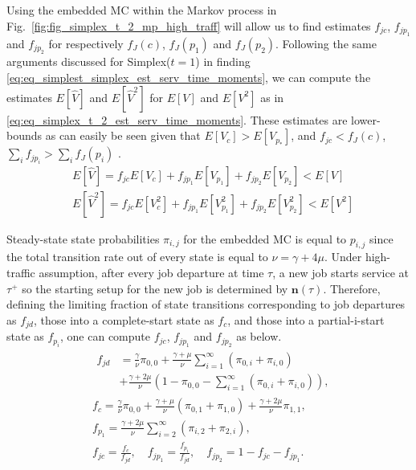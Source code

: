 \documentclass[sigconf,draft]{acmart}
\begin{document}
Using the embedded MC within the Markov process in Fig.~\ref{fig:fig_simplex_t_2_mp_high_traff} will allow us to find estimates $f_{jc}$, $f_{jp_1}$ and $f_{jp_2}$ for respectively $f_J(c)$, $f_J(p_1)$ and $f_J(p_2)$. Following the same arguments discussed for Simplex($t=1$) in finding \eqref{eq:eq_simplest_simplex_est_serv_time_moments}, we can compute the estimates $E[\hat{V}]$ and $E[\hat{V}^2]$ for $E[V]$ and $E[V^2]$ as in \eqref{eq:eq_simplex_t_2_est_serv_time_moments}. These estimates are lower-bounds as can easily be seen given that $E[V_c] > E[V_{p_*}]$, and $f_{jc} < f_J(c)$, $\sum_{i}f_{jp_i} > \sum_{i}f_J(p_i)$ .
\begin{equation}
  \label{eq:eq_simplex_t_2_est_serv_time_moments}
  \begin{split}
    & E[\hat{V}] = f_{jc}E[V_c] + f_{jp_1}E[V_{p_1}] + f_{jp_2}E[V_{p_2}] < E[V] \\
    & E[\hat{V}^2] = f_{jc}E[V_c^2] + f_{jp_1}E[V_{p_1}^2] + f_{jp_2}E[V_{p_2}^2] < E[V^2]
  \end{split}
\end{equation}

Steady-state state probabilities $\pi_{i,j}$ for the embedded MC is equal to $p_{i,j}$ since the total transition rate out of every state is equal to $\nu=\gamma+4\mu$. Under high-traffic assumption, after every job departure at time $\tau$, a new job starts service at $\tau^+$ so the starting setup for the new job is determined by $\bm{n}(\tau)$. Therefore, defining the limiting fraction of state transitions corresponding to job departures as $f_{jd}$, those into a complete-start state as $f_c$, and those into a partial-i-start state as $f_{p_i}$, one can compute $f_{jc}$, $f_{jp_1}$ and $f_{jp_2}$ as below.
\begin{equation}
  \label{eq:eq_simplex_t_2_start_setup_fracs}
  \begin{split}
    & \begin{aligned}
      f_{jd} &= \frac{\gamma}{\nu}\pi_{0,0} + \frac{\gamma+\mu}{\nu}\sum_{i=1}^{\infty}(\pi_{0,i}+\pi_{i,0}) \\
      &+ \frac{\gamma+2\mu}{\nu}(1-\pi_{0,0}-\sum_{i=1}^{\infty}(\pi_{0,i}+\pi_{i,0})),
    \end{aligned} \\
    & f_c = \frac{\gamma}{\nu}\pi_{0,0} + \frac{\gamma+\mu}{\nu}(\pi_{0,1}+\pi_{1,0}) + \frac{\gamma+2\mu}{\nu}\pi_{1,1}, \\
    & f_{p_1} = \frac{\gamma+2\mu}{\nu}\sum_{i=2}^{\infty}(\pi_{i,2}+\pi_{2,i}), \\
    & f_{jc} = \frac{f_c}{f_{jd}}, \quad f_{jp_1} = \frac{f_{p_1}}{f_{jd}}, \quad f_{jp_2} = 1-f_{jc}-f_{jp_1}.
  \end{split}
\end{equation}
\end{document}
